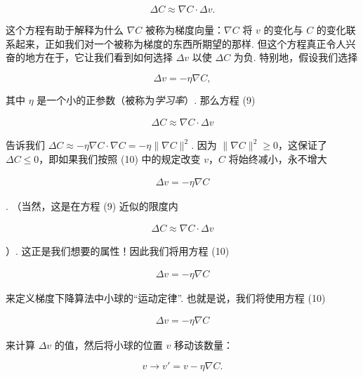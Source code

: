 \begin{equation}
\Delta C \approx \nabla C \cdot \Delta v.
\tag{9}
\end{equation}

\noindent 这个方程有助于解释为什么 $\nabla C$ 被称为梯度向量：$\nabla C$ 将 $v$ 的变化与 $C$ 的变化联系起来，正如我们对一个被称为梯度的东西所期望的那样. 但这个方程真正令人兴奋的地方在于，它让我们看到如何选择 $\Delta v$ 以使 $\Delta C$ 为负. 特别地，假设我们选择

\begin{equation}
\Delta v = -\eta \nabla C,
\tag{10}
\end{equation}

\noindent 其中 $\eta$ 是一个小的正参数（被称为\emph{学习率}）. 那么方程 (9)

\begin{align*}
\Delta C \approx \nabla C \cdot \Delta v \nonumber
\end{align*}

\noindent 告诉我们 $\Delta C \approx -\eta \nabla C \cdot \nabla C = -\eta \|\nabla C\|^2$. 因为 $\| \nabla C \|^2 \geq 0$，这保证了 $\Delta C \leq 0$，即如果我们按照 (10) 中的规定改变 $v$，$C$ 将始终减小，永不增大

\begin{align*}
\Delta v = -\eta \nabla C \nonumber
\end{align*}

\noindent. （当然，这是在方程 (9) 近似的限度内

\begin{align*}
\Delta C \approx \nabla C \cdot \Delta v \nonumber
\end{align*}

\noindent ）. 这正是我们想要的属性！因此我们将用方程 (10)

\begin{align*}
\Delta v = -\eta \nabla C \nonumber
\end{align*}

\noindent 来定义梯度下降算法中小球的``运动定律''. 也就是说，我们将使用方程 (10)

\begin{align*}
\Delta v = -\eta \nabla C \nonumber
\end{align*}

\noindent 来计算 $\Delta v$ 的值，然后将小球的位置 $v$ 移动该数量：

\begin{equation}
v \rightarrow v' = v -\eta \nabla C.
\tag{11}
\end{equation}

